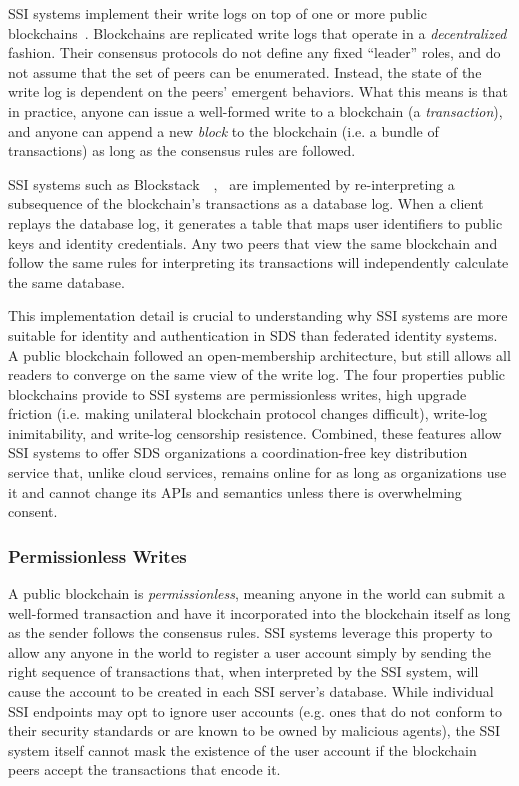 SSI systems implement their write logs on top of one or more public
blockchains~\cite{bitcoin}.  Blockchains are replicated write logs that
operate in a \emph{decentralized} fashion.  Their consensus protocols do not 
define any fixed ``leader'' roles, and do not assume that the set of peers can
be enumerated.  Instead, the state of the write log is dependent on the
peers' emergent behaviors.  What this means is that in practice,
anyone can issue a well-formed write to a blockchain
(a \emph{transaction}), and anyone can append a new \emph{block} to the
blockchain (i.e. a bundle of transactions)
as long as the consensus rules are followed.

SSI systems such as
Blockstack~\cite{blockstack}~\cite{ali2017},~\cite{blockstack-whitepaper}
are implemented by re-interpreting a subsequence of the blockchain's
transactions as a database log.  When a client replays the database log, it
generates a table that maps user identifiers to public keys and identity
credentials.  Any two peers that view the same blockchain and follow the
same rules for interpreting its transactions will independently
calculate the same database.

This implementation detail is crucial to understanding why SSI systems are
more suitable for identity and authentication in SDS than federated identity
systems.  A public blockchain followed an open-membership architecture, but
still allows all readers to converge on the same view of the write log.
The four properties public blockchains provide to SSI systems are
permissionless writes, high upgrade friction (i.e. making unilateral blockchain
protocol changes difficult), write-log inimitability, and write-log censorship
resistence.  Combined, these features allow SSI systems to offer SDS organizations a
coordination-free key distribution service that, unlike cloud services, remains
online for as long as organizations use it and cannot change its APIs and
semantics unless there is overwhelming consent.

\subsubsection{Permissionless Writes}

A public blockchain is \emph{permissionless}, meaning anyone in the world can submit a
well-formed transaction and have it incorporated into the blockchain itself as
long as the sender follows the consensus rules.
SSI systems leverage this property to allow any anyone in the world to register a user account
simply by sending the right sequence of transactions that, when interpreted by the SSI system, will
cause the account to be created in each SSI server's database.
While individual SSI endpoints may opt to ignore user accounts (e.g. ones that do not conform to their security
standards or are known to be owned by malicious agents), the SSI system itself cannot
mask the existence of the user account if the blockchain peers accept the
transactions that encode it.

